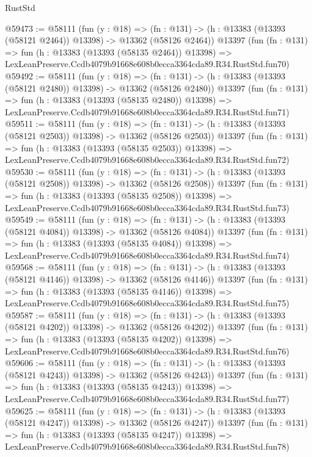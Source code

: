 \begin{lexlean}{RustStd}
\begin{coremodule}
@59473 := @58111
    (fun (y : @18) =>
    (fn : @131) -> (h : @13383 (@13393 (@58121 @2464)) @13398) -> @13362 (@58126 @2464))
    @13397
    (fun (fn : @131) =>
    fun (h : @13383 (@13393 (@58135 @2464)) @13398) =>
    LexLeanPreserve.Ccdb4079b91668e608b0ecca3364cda89.R34.RustStd.fun70)
@59492 := @58111
    (fun (y : @18) =>
    (fn : @131) -> (h : @13383 (@13393 (@58121 @2480)) @13398) -> @13362 (@58126 @2480))
    @13397
    (fun (fn : @131) =>
    fun (h : @13383 (@13393 (@58135 @2480)) @13398) =>
    LexLeanPreserve.Ccdb4079b91668e608b0ecca3364cda89.R34.RustStd.fun71)
@59511 := @58111
    (fun (y : @18) =>
    (fn : @131) -> (h : @13383 (@13393 (@58121 @2503)) @13398) -> @13362 (@58126 @2503))
    @13397
    (fun (fn : @131) =>
    fun (h : @13383 (@13393 (@58135 @2503)) @13398) =>
    LexLeanPreserve.Ccdb4079b91668e608b0ecca3364cda89.R34.RustStd.fun72)
@59530 := @58111
    (fun (y : @18) =>
    (fn : @131) -> (h : @13383 (@13393 (@58121 @2508)) @13398) -> @13362 (@58126 @2508))
    @13397
    (fun (fn : @131) =>
    fun (h : @13383 (@13393 (@58135 @2508)) @13398) =>
    LexLeanPreserve.Ccdb4079b91668e608b0ecca3364cda89.R34.RustStd.fun73)
@59549 := @58111
    (fun (y : @18) =>
    (fn : @131) -> (h : @13383 (@13393 (@58121 @4084)) @13398) -> @13362 (@58126 @4084))
    @13397
    (fun (fn : @131) =>
    fun (h : @13383 (@13393 (@58135 @4084)) @13398) =>
    LexLeanPreserve.Ccdb4079b91668e608b0ecca3364cda89.R34.RustStd.fun74)
@59568 := @58111
    (fun (y : @18) =>
    (fn : @131) -> (h : @13383 (@13393 (@58121 @4146)) @13398) -> @13362 (@58126 @4146))
    @13397
    (fun (fn : @131) =>
    fun (h : @13383 (@13393 (@58135 @4146)) @13398) =>
    LexLeanPreserve.Ccdb4079b91668e608b0ecca3364cda89.R34.RustStd.fun75)
@59587 := @58111
    (fun (y : @18) =>
    (fn : @131) -> (h : @13383 (@13393 (@58121 @4202)) @13398) -> @13362 (@58126 @4202))
    @13397
    (fun (fn : @131) =>
    fun (h : @13383 (@13393 (@58135 @4202)) @13398) =>
    LexLeanPreserve.Ccdb4079b91668e608b0ecca3364cda89.R34.RustStd.fun76)
@59606 := @58111
    (fun (y : @18) =>
    (fn : @131) -> (h : @13383 (@13393 (@58121 @4243)) @13398) -> @13362 (@58126 @4243))
    @13397
    (fun (fn : @131) =>
    fun (h : @13383 (@13393 (@58135 @4243)) @13398) =>
    LexLeanPreserve.Ccdb4079b91668e608b0ecca3364cda89.R34.RustStd.fun77)
@59625 := @58111
    (fun (y : @18) =>
    (fn : @131) -> (h : @13383 (@13393 (@58121 @4247)) @13398) -> @13362 (@58126 @4247))
    @13397
    (fun (fn : @131) =>
    fun (h : @13383 (@13393 (@58135 @4247)) @13398) =>
    LexLeanPreserve.Ccdb4079b91668e608b0ecca3364cda89.R34.RustStd.fun78)

\end{coremodule}
\end{lexlean}
